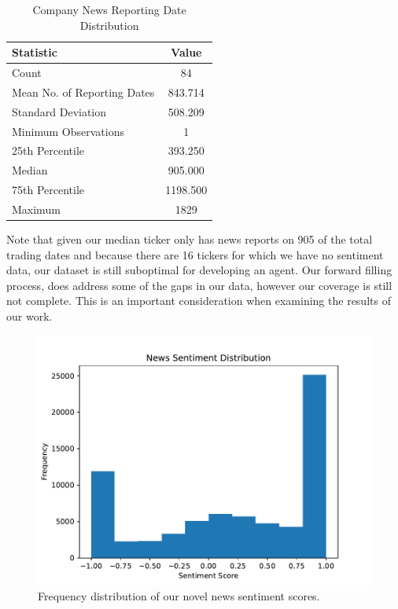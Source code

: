 \begin{table}[htbp]
    \centering
    \caption{Company News Reporting Date Distribution}
    \begin{tabular}{l c}
        \toprule
        \textbf{Statistic} & \textbf{Value} \\
        \midrule
        Count & 84 \\
        Mean No. of Reporting Dates & 843.714 \\
        Standard Deviation & 508.209 \\
        Minimum Observations & 1 \\
        25th Percentile & 393.250 \\
        Median & 905.000 \\
        75th Percentile & 1198.500 \\
        Maximum & 1829 \\
        \bottomrule
    \end{tabular}
    \label{table:news_dist}
\end{table}

Note that given our median ticker only has news reports on 905 of the total trading dates and because there are 16 tickers for which we have no sentiment data, our dataset is still suboptimal for developing an agent. Our forward filling process, does address some of the gaps in our data, however our coverage is still not complete.
This is an important consideration when examining the results of our work.

\begin{figure}
  \centering
  \includegraphics[width=.9\textwidth]{../figures/news_sent_dist}
  \caption{Frequency distribution of our novel news sentiment scores.}
  \label{fig:news_dist}
\end{figure}

